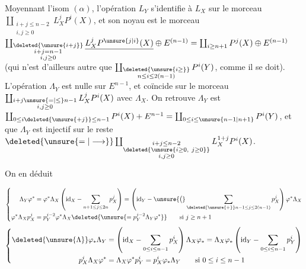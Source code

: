  Moyennant l'isom $(\alpha)$, l'opération $L_Y$ s'identifie à $L_X$ sur le morceau $\coprod_{\substack{i+j\leq n-2\\i,j\geq0}}L_X^jP^i(X)$, et son noyau est le morceau $\coprod_{\substack{\deleted{\unsure{i+j}}\\i+j=n-1\\i,j\geq0}}\underline{L_X^jP^{\unsure{j|i}}(X)}\oplus E^{(n-1)}=\coprod_{i\geq n+1}P^j(X)\oplus E^{(n-1)}$ (qui n'est d'ailleurs autre que $\coprod_{\substack{\deleted{\unsure{i\geq}}\\n\leq i\leq2(n-1)}}P^i(Y)$, comme il se doit). L'opération $\Lambda_Y$ est nulle sur $E^{n-1}$, et coïncide sur le morceau $\coprod_{\substack{i+j\unsure{=|\leq} n-1\\i,j\geq0}}L_X^jP^i(X)$ avec $\Lambda_X$. On retrouve   $\Lambda_Y$  est $\coprod_{0\leq i\deleted{\unsure{+j}}\leq n-1}P^i(X)+E^{n-1}=\coprod_{0\leq i\leq \unsure{n-1|n+1}}P^i(Y)$,  et que $\Lambda_Y$ est injectif sur le reste $\deleted{\unsure{=|\longrightarrow}}\coprod_{\substack{i+j\leq n-2\\\deleted{\unsure{i\geq0,\ j\geq0}}\\i,j\geq0}}L_X^{1+j}P^i(X)$.

On en déduit

\[
\left\{\begin{aligned}
 \Lambda_Y\varphi^*&=\varphi^*\Lambda_X\left(\mathrm{id}_X-\sum_{n+1\leq j\leq2n}p_X^j\right)
 =\left(\mathrm{id}_Y-\unsure{\bigl(}\sum_{\deleted{\unsure{+}}n-1\leq j\leq 2(n-1)}p_X^j\right)\varphi^*\Lambda_X\\
 \varphi^*\Lambda_Xp_X^j&=p_Y^{j-2}\varphi^*\Lambda_X\deleted{\unsure{=p_Y^{j-2}\Lambda_Y\varphi^*}}\qquad\text{si }j\geq n+1
\end{aligned}\right.
\]
\[
\left\{\begin{aligned}
 \deleted{\unsure{\Lambda}}\varphi_*\Lambda_Y&=\left(\mathrm{id}_X-\sum_{0\leq i\leq n-1}p_X^i\right)\Lambda_X\varphi_*=\Lambda_X\varphi_*\left(\mathrm{id}_Y-\sum_{0\leq i\leq n-1}p_Y^i\right)\\
 p_X^i\Lambda_X\varphi^*&=\Lambda_X\varphi^*p_Y^i=p_X^i\varphi_*\Lambda_Y\qquad\text{si }0\leq i\leq n-1
\end{aligned}\right.
\]

